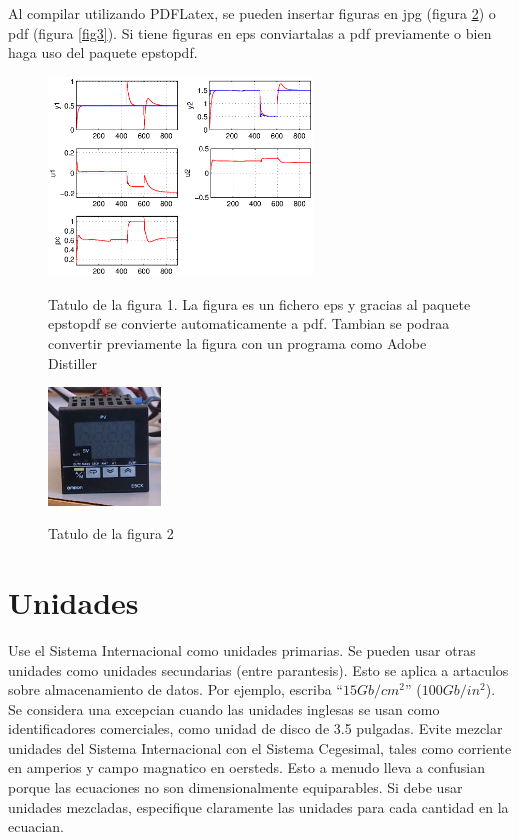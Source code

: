 \documentclass[5p,times,authoryear]{elsarticle}
\begin{document}
Al compilar utilizando PDFLatex, se pueden insertar figuras en jpg (figura \ref{fig2}) o pdf (figura \ref{fig3}). Si tiene figuras en eps conviartalas a pdf previamente o bien haga uso del paquete epstopdf.

\begin{figure}
\centering
  \includegraphics[width=7cm]{figuraeps}\\
  \caption{Tatulo de la figura 1. La figura es un fichero eps y gracias al paquete epstopdf se convierte automaticamente a pdf. Tambian se podraa convertir previamente la figura con un programa como Adobe Distiller}\label{fig1}
\end{figure}

\begin{figure}
\centering


  \includegraphics[width=3cm]{figurajpeg}\\
  \caption{Tatulo de la figura 2}\label{fig2}
\end{figure}


\section{Unidades}

Use el Sistema Internacional como unidades primarias. Se pueden usar
otras unidades como unidades secundarias (entre parantesis). Esto se
aplica a artaculos sobre almacenamiento de datos. Por ejemplo,
escriba ``$15 Gb/cm^2$'' ($100 Gb/in^2$). Se considera una excepcian
cuando las unidades inglesas se usan como identificadores
comerciales, como unidad de disco de 3.5 pulgadas. Evite mezclar
unidades del Sistema Internacional con el Sistema Cegesimal, tales
como corriente en amperios y campo magnatico en  oersteds. Esto a
menudo lleva a confusian porque las ecuaciones no son
dimensionalmente equiparables. Si debe usar unidades mezcladas,
especifique claramente las unidades para cada cantidad  en la
ecuacian. \citep{Abl:45} \citep{Abl:56} \citep{AbTaRu:54}
\end{document}
